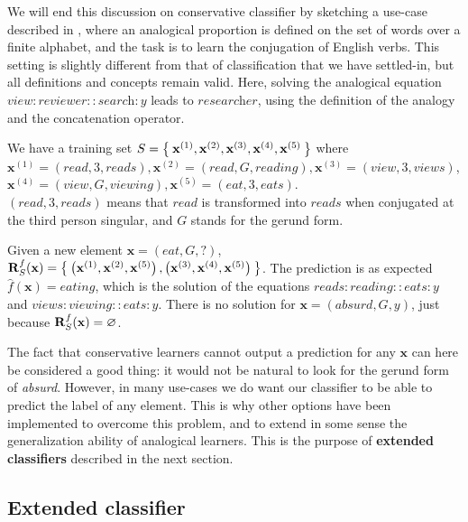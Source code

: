 We will end this discussion on conservative classifier by sketching a use-case
described in \cite{StrYvoREPORT05}, where an analogical proportion is defined
on the set of words over a finite alphabet, and the task is to learn the
conjugation of English verbs. This setting is slightly different from that of
classification that we have settled-in, but all definitions and concepts remain
valid. Here, solving the analogical equation
$\textit{view}:\textit{reviewer}::\textit{search}:y$ leads to $\textit{researcher}$,
using the definition of the analogy and the concatenation operator.


\begin{testexample}
We have a training set $S=\Set{\mathbf{x}^{(1)},\mathbf{x}^{(2)},
\mathbf{x}^{(3)}, \mathbf{x}^{(4)}, \mathbf{x}^{(5)}}$ where
  $\mathbf{x}^{(1)}=(\textit{read},3,\textit{reads}),
  \mathbf{x}^{(2)}=(\textit{read},G,\textit{reading}),
  \mathbf{x}^{(3)}=(\textit{view},3,\textit{views})$,
  $\mathbf{x}^{(4)}=(\textit{view},G,\textit{viewing}),
  \mathbf{x}^{(5)}=(\textit{eat},3,\textit{eats})$.\\
  $(\textit{read},3,\textit{reads})$ means that $\textit{read}$ is
  transformed into $\textit{reads}$ when conjugated at the third person
  singular, and $G$ stands for the gerund form.

  Given a new element $\mathbf{x}=(\textit{eat},G,?)$, $\mathbf{R}_{S}^{f}(\mathbf{x})=
\Set{\left(\mathbf{x}^{(1)}, \mathbf{x}^{(2)}, \mathbf{x}^{(5)}\right),
\left(\mathbf{x}^{(3)},\mathbf{x}^{(4)},\mathbf{x}^{(5)}\right)}$. The
prediction is as expected $\hat{f}(\mathbf{x})=\textit{eating}$, which is the
solution of the equations $\textit{reads}:\textit{reading}::\textit{eats}:y$ and
$\textit{views}:\textit{viewing}::\textit{eats}:y$. There is
  no solution for $\mathbf{x}=(\textit{absurd},G,y)$, just because $\mathbf{R}_{S}^{f}(\mathbf{x})=
  \varnothing$.
\end{testexample}

The fact that conservative learners cannot output a prediction for any
$\mathbf{x}$ can here be considered a good thing: it would not be natural to
look for the gerund form of \textit{absurd}. However, in many use-cases we do
want our classifier to be able to predict the label of any element. This is why
other options have been implemented to overcome this problem, and to extend in
some sense the generalization ability of analogical learners. This is the
purpose of \textbf{extended classifiers} described in the next section.

\subsection{Extended classifier}
\label{SEC:extended_classifier}

